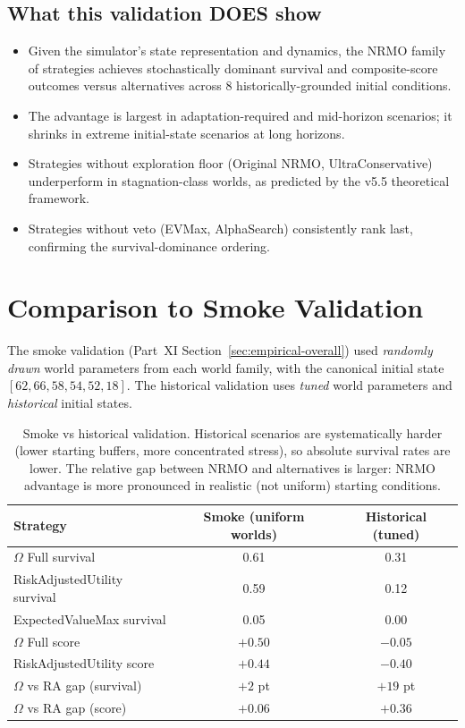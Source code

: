 \subsection{What this validation DOES show}

\begin{itemize}
\item Given the simulator's state representation and dynamics,
the NRMO family of strategies achieves stochastically dominant
survival and composite-score outcomes versus alternatives across
8 historically-grounded initial conditions.
\item The advantage is largest in adaptation-required and
mid-horizon scenarios; it shrinks in extreme initial-state
scenarios at long horizons.
\item Strategies without exploration floor (Original NRMO,
UltraConservative) underperform in stagnation-class worlds, as
predicted by the v5.5 theoretical framework.
\item Strategies without veto (EVMax, AlphaSearch) consistently
rank last, confirming the survival-dominance ordering.
\end{itemize}

\section{Comparison to Smoke Validation}
\label{sec:hist-comparison-smoke}

The smoke validation (Part~XI Section~\ref{sec:empirical-overall})
used \emph{randomly drawn} world parameters from each world family,
with the canonical initial state $[62, 66, 58, 54, 52, 18]$. The
historical validation uses \emph{tuned} world parameters and
\emph{historical} initial states.

\begin{table}[ht]
\centering
\small
\begin{tabularx}{\linewidth}{Xcc}
\toprule
\textbf{Strategy} & \textbf{Smoke (uniform worlds)} & \textbf{Historical (tuned)} \\
\midrule
$\Omega$ Full survival & 0.61 & 0.31 \\
RiskAdjustedUtility survival & 0.59 & 0.12 \\
ExpectedValueMax survival & 0.05 & 0.00 \\
\midrule
$\Omega$ Full score & $+0.50$ & $-0.05$ \\
RiskAdjustedUtility score & $+0.44$ & $-0.40$ \\
\midrule
$\Omega$ vs RA gap (survival) & $+2$ pt & $+19$ pt \\
$\Omega$ vs RA gap (score) & $+0.06$ & $+0.36$ \\
\bottomrule
\end{tabularx}
\caption[Smoke vs historical comparison]{Smoke vs historical
validation. Historical scenarios are systematically harder
(lower starting buffers, more concentrated stress), so absolute
survival rates are lower. The relative gap between NRMO and
alternatives is larger: NRMO advantage is more pronounced in
realistic (not uniform) starting conditions.}
\label{tab:hist-smoke-comparison}
\end{table}


